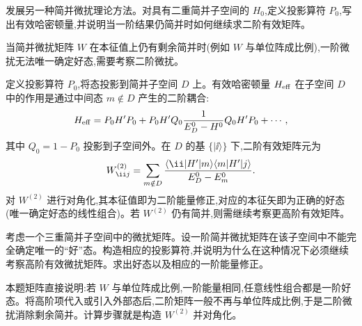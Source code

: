 \begin{question}
发展另一种简并微扰理论方法。对具有二重简并子空间的 $H_0$,定义投影算符 $P_0$,写出有效哈密顿量,并说明当一阶结果仍简并时如何继续求二阶有效矩阵。
\begin{solution}
当简并微扰矩阵 $W$ 在本征值上仍有剩余简并时(例如 $W$ 与单位阵成比例),一阶微扰无法唯一确定好态,需要考察二阶微扰。

定义投影算符 $P_0$,将态投影到简并子空间 $D$ 上。有效哈密顿量 $H_{\rm eff}$ 在子空间 $D$ 中的作用是通过中间态 $m\notin D$ 产生的二阶耦合:
\[
H_{\rm eff} = P_0 H' P_0 + P_0 H' Q_0 {1\over E_D^0-H^0} Q_0 H' P_0 + \cdots,
\]
其中 $Q_0=1-P_0$ 投影到子空间外。在 $D$ 的基 $\{|\ii\rangle\}$ 下,二阶有效矩阵元为
\[
W^{(2)}_{\ii j} = \sum_{m\notin D} {\langle \ii|H'|m\rangle\langle m|H'|j\rangle\over E_D^0 - E_m^0}.
\]
对 $W^{(2)}$ 进行对角化,其本征值即为二阶能量修正,对应的本征矢即为正确的好态(唯一确定好态的线性组合)。若 $W^{(2)}$ 仍有简并,则需继续考察更高阶有效矩阵。
\end{solution}
\end{question}

\begin{question}
考虑一个三重简并子空间中的微扰矩阵。设一阶简并微扰矩阵在该子空间中不能完全确定唯一的“好”态。构造相应的投影算符,并说明为什么在这种情况下必须继续考察高阶有效微扰矩阵。求出好态以及相应的一阶能量修正。
\begin{solution}
本题矩阵直接说明:若 $W$ 与单位阵成比例,一阶能量相同,任意线性组合都是一阶好态。将高阶项代入或引入外部态后,二阶矩阵一般不再与单位阵成比例,于是二阶微扰消除剩余简并。计算步骤就是构造 $W^{(2)}$ 并对角化。
\end{solution}
\end{question}

